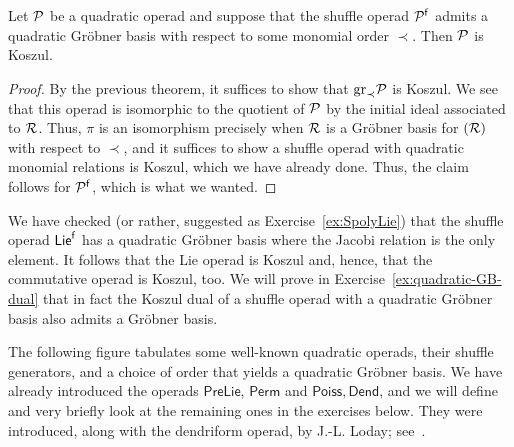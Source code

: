  \begin{theorem}
 Let $\mathcal P$ be a quadratic operad and suppose
 that the shuffle operad $\mathcal P^{\mathsf{f}}$ admits a
 quadratic Gr\"obner basis with respect to some
 monomial order $\prec$. Then $\mathcal P$ is
 Koszul. 
 \end{theorem}
 
 \begin{proof}
 By the previous theorem, it suffices to show
 that $\mathrm{gr}_\prec \mathcal P$ is Koszul. We
 see that this operad is isomorphic to the
 quotient of $\mathcal P$ by the initial ideal associated
 to $\mathcal{R}$. Thus, $\pi$ is an isomorphism 
 precisely when $\mathcal{R}$ is a Gr\"obner basis
 for $(\mathcal{R})$ with respect to $\prec$, and
 it suffices to show
 a shuffle operad with quadratic monomial
 relations is Koszul, which we have
 already done. Thus,
 the claim follows for
 $\mathcal P^{\mathsf{f}}$, which is what we wanted. 
 \end{proof}
 

\begin{example}
We have checked (or rather, suggested as Exercise~\ref{ex:SpolyLie})
that the shuffle operad $\mathsf{Lie}^{\mathsf{f}}$ has a quadratic Gr\"obner
basis where the Jacobi relation is the only element. It follows
that the Lie operad is Koszul and, hence, that the commutative
operad is Koszul, too. We will prove in Exercise~\ref{ex:quadratic-GB-dual} that in fact the Koszul dual of a shuffle operad with
a quadratic Gr\"obner basis also admits a Gr\"obner basis.
\end{example}

The following figure tabulates some well-known
quadratic operads, their shuffle generators,
and a choice of order that yields a quadratic
Gr\"obner basis. We have already introduced the
operads $\mathsf{PreLie}$, $\mathsf{Perm}$ and
$\mathsf{Poiss},\mathsf{Dend}$, 
and we will define and
very briefly look at the
remaining ones
in the exercises below.
They were introduced, along with
the dendriform operad, by
J.-L. Loday; see~\cite{LodayDialg, LodayLeib}.

